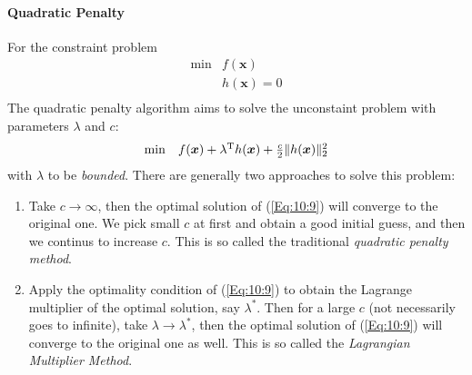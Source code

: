 \paragraph{Quadratic Penalty}
For the constraint problem
\begin{equation}
\begin{array}{ll}
\min&f(\bm x)\\
&h(\bm x)=0\\
\end{array}
\end{equation}
The quadratic penalty algorithm aims to solve the unconstaint problem with parameters $\lambda$ and $c$:
\begin{equation}\label{Eq:10:9}
\begin{array}{ll}
\min&f(\bm x)+\lambda\trans h(\bm x)+\frac{c}{2}\|h(\bm x)\|_2^2\\
\end{array}
\end{equation}
with $\lambda$ to be \emph{bounded}. There are generally two approaches to solve this problem:
\begin{enumerate}
\item
Take $c\to\infty$, then the optimal solution of (\ref{Eq:10:9}) will converge to the original one. We pick small $c$ at first and obtain a good initial guess, and then we continus to increase $c$. This is so called the traditional \emph{quadratic penalty method}.
\item
Apply the optimality condition of (\ref{Eq:10:9}) to obtain the Lagrange multiplier of the optimal solution, say $\lambda^*$. Then for a large $c$ (not necessarily goes to infinite), take $\lambda\to\lambda^*$, then the optimal solution of (\ref{Eq:10:9}) will converge to the original one as well. This is so called the \emph{Lagrangian Multiplier Method}.
\end{enumerate}
